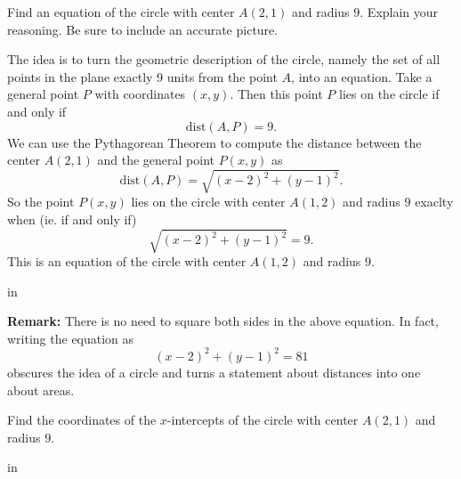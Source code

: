 \documentclass{ximera}
\newcommand{\pskip}{\vskip 0.1 in}
\begin{document}
\begin{example} \label{Ex2}
Find an equation of the circle with center $A(2,1)$ and radius $9$. Explain your reasoning. Be sure to include an accurate picture.
\end{example}

\begin{explanation}
The idea is to turn the geometric description of the circle, namely the set of all points in the plane exactly 9 units from the point $A$, into an equation. Take a general point $P$ with coordinates $(x,y)$. Then this point $P$ lies on the circle if and only if
\[
     \text{dist}(A,P) = 9 .
\]
We can use the Pythagorean Theorem to compute the distance between the center $A(2,1)$ and the general point $P(x,y)$ as 
\[
 \text{dist}(A,P) =  \sqrt{(x-2)^2 + (y-1)^2} .
\]
So the point $P(x,y)$ lies on the circle with center $A(1,2)$ and radius $9$ exaclty when (ie. if and only if)
\[
     \sqrt{(x-2)^2 + (y-1)^2} = 9 .
\]
This is an equation of the circle with center $A(1,2)$ and radius $9$. 

\pskip

{\bf Remark:}  There is no need to square both sides in the above equation. In fact, writing the equation as
\[
      (x-2)^2 + (y-1)^2 = 81
\]
obscures the idea of a circle and turns a statement about distances into one about areas.


\iffalse   %

\begin{figure}[!h]
\centerline{
\texttt{[image: Circle1B.eps]}   
}
\end{figure}

\fi          %

\end{explanation}


\begin{example}   \label{Ex3}
Find the coordinates of the $x$-intercepts of the circle with center $A(2,1)$ and radius $9$. %
\end{example}

\pskip
\end{document}
